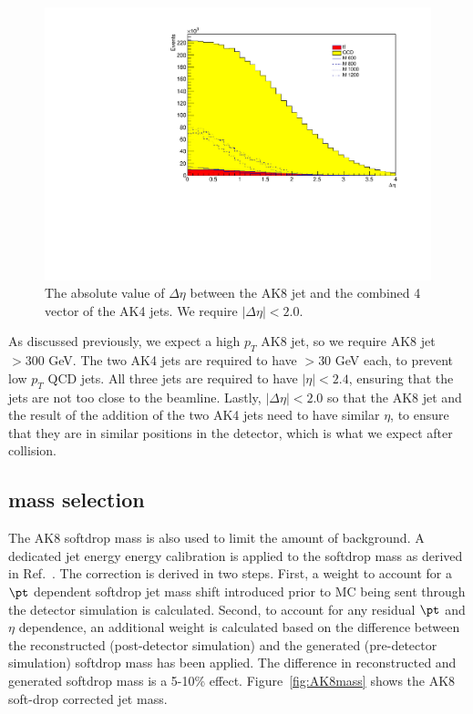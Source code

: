 \begin{figure}[thb!]
\begin{center}
\includegraphics[scale=0.34]{F5/shapedeta.pdf}
\end{center}
\caption{The absolute value of $\Delta\eta$ between the AK8 jet and the combined 4 vector of the AK4 jets. We require $|\Delta\eta| < 2.0$.}
\label{fig:deta}
\end{figure} 

As discussed previously, we expect a high $p_{T}$ AK8 jet, so we require AK8 jet $> 300$ GeV. The two AK4 jets are required to have $> 30$ GeV each, to prevent low $p_{T}$ QCD jets. All three jets are required to have $|\eta| < 2.4$, ensuring that the jets are not too close to the beamline. Lastly, $|\Delta\eta| < 2.0$ so that the AK8 jet and the result of the addition of the two AK4 jets need to have similar $\eta$, to ensure that they are in similar positions in the detector, which is what we expect after collision.

\subsection{\texorpdfstring{\PH}{H} mass selection\label{ss:EvtSelMass}}

The AK8 softdrop mass is also used to limit the amount of background. A dedicated jet energy energy calibration is applied to the softdrop mass as derived in Ref.~\cite{CMS-AN-16-235}. The correction is derived in two steps. First, a weight to account for a $\pt$ dependent softdrop jet mass shift introduced prior to MC being sent through the detector simulation is calculated. Second, to account for any residual $\pt$ and $\eta$ dependence, an additional weight is calculated based on the difference between the reconstructed (post-detector simulation) and the generated (pre-detector simulation) softdrop mass has been applied. The difference in reconstructed and generated softdrop mass is a 5-10\% effect. 
Figure~\ref{fig:AK8mass} shows the AK8 soft-drop corrected jet mass. 

